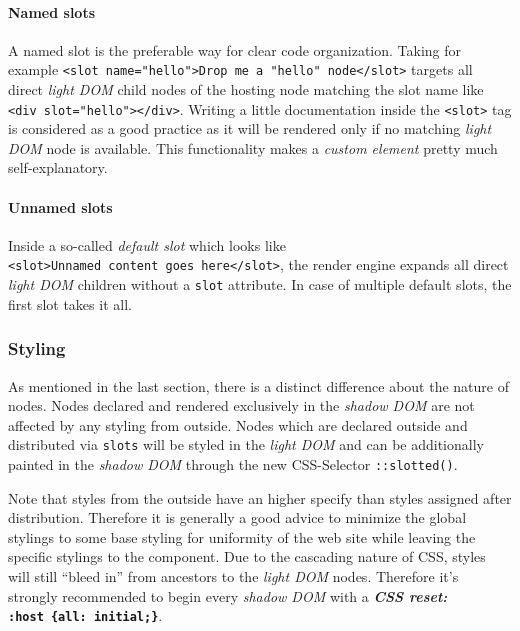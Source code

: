\documentclass[]{assets/latex/ieee}
\let\oldparagraph\paragraph
\renewcommand{\paragraph}[1]{\oldparagraph{#1}\mbox{}}
\begin{document}
\paragraph{Named slots}\label{named-slots}

A named slot is the preferable way for clear code organization. Taking
for example
\texttt{\textless{}slot\ name="hello"\textgreater{}Drop\ me\ a\ "hello"\ node\textless{}/slot\textgreater{}}
targets all direct \emph{light DOM} child nodes of the hosting node
matching the slot name like
\texttt{\textless{}div\ slot="hello"\textgreater{}\textless{}/div\textgreater{}}.
Writing a little documentation inside the
\texttt{\textless{}slot\textgreater{}} tag is considered as a good
practice as it will be rendered only if no matching \emph{light DOM}
node is available. This functionality makes a \emph{custom element}
pretty much self-explanatory.

\paragraph{Unnamed slots}\label{unnamed-slots}

Inside a so-called \emph{default slot} which looks like
\texttt{\textless{}slot\textgreater{}Unnamed\ content\ goes\ here\textless{}/slot\textgreater{}},
the render engine expands all direct \emph{light DOM} children without a
\texttt{slot} attribute. In case of multiple default slots, the first
slot takes it all.

\subsubsection{Styling}\label{styling}

As mentioned in the last section, there is a distinct difference about
the nature of nodes. Nodes declared and rendered exclusively in the
\emph{shadow DOM} are not affected by any styling from outside. Nodes
which are declared outside and distributed via \texttt{slots} will be
styled in the \emph{light DOM} and can be additionally painted in the
\emph{shadow DOM} through the new CSS-Selector \texttt{::slotted()}.

Note that styles from the outside have an higher specify than styles
assigned after distribution. Therefore it is generally a good advice to
minimize the global stylings to some base styling for uniformity of the
web site while leaving the specific stylings to the component. Due to
the cascading nature of CSS, styles will still ``bleed in'' from
ancestors to the \emph{light DOM} nodes. Therefore it's strongly
recommended to begin every \emph{shadow DOM} with a \textbf{\emph{CSS
reset:} \texttt{:host\ \{all:\ initial;\}}}.
\end{document}
